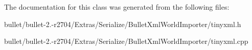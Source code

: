 The documentation for this class was generated from the following files\+:\begin{DoxyCompactItemize}
\item 
bullet/bullet-\/2.-\/r2704/\+Extras/\+Serialize/\+Bullet\+Xml\+World\+Importer/tinyxml.\+h\item 
bullet/bullet-\/2.-\/r2704/\+Extras/\+Serialize/\+Bullet\+Xml\+World\+Importer/tinyxml.\+cpp\end{DoxyCompactItemize}
